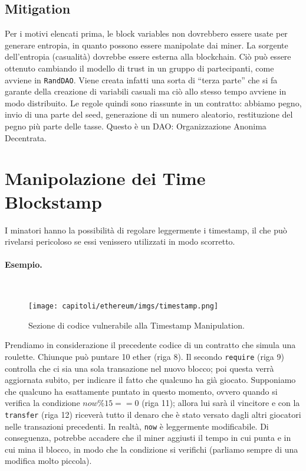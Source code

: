 \vspace{-1em}

\subsection{Mitigation}

Per i motivi elencati prima, le block variables non dovrebbero essere usate per
generare entropia, in
quanto possono essere manipolate dai miner.
La sorgente dell'entropia (casualità) dovrebbe essere esterna alla blockchain.
Ciò può
essere ottenuto cambiando il modello di trust in un gruppo di partecipanti,
come avviene in
\verb|RandDAO|. Viene creata infatti una sorta di ``terza parte'' che si fa garante
della creazione di
variabili casuali ma ciò allo stesso tempo avviene in modo distribuito.
Le regole quindi sono riassunte in un contratto: abbiamo pegno, invio di una parte
del seed,
generazione di un numero aleatorio, restituzione del pegno più parte delle tasse.
Questo è un DAO: Organizzazione Anonima Decentrata.

\vspace{-1em}

\section{Manipolazione dei Time Blockstamp}

I minatori hanno la possibilità di regolare leggermente i timestamp,
il che può rivelarsi
pericoloso se essi venissero utilizzati in modo scorretto.

\vspace{-1em}

\paragraph{Esempio.}\

\vspace{-0.5em}

\begin{figure}[H]
      \centering
      \texttt{[image: capitoli/ethereum/imgs/timestamp.png]}
      \caption{Sezione di codice vulnerabile alla Timestamp Manipulation.}
\end{figure}

Prendiamo in considerazione il precedente codice di un contratto che simula una roulette.
Chiunque può puntare 10 ether (riga 8).
Il secondo \verb|require| (riga 9) controlla che ci sia una sola transazione nel nuovo blocco;
poi questa verrà aggiornata subito, per indicare il fatto che qualcuno ha già giocato.
Supponiamo che qualcuno ha esattamente puntato in questo
momento, ovvero quando si verifica la condizione $now \%15 ==  0$ (riga 11); allora lui sarà il vincitore e con la \verb|transfer| (riga 12) riceverà tutto il denaro che è stato versato dagli altri giocatori nelle
transazioni precedenti.
In realtà, \verb|now| è leggermente modificabile.
Di conseguenza, potrebbe accadere che il miner aggiusti il tempo in cui punta e in cui mina il blocco,
in modo che la condizione si verifichi (parliamo sempre di una modifica molto piccola).

